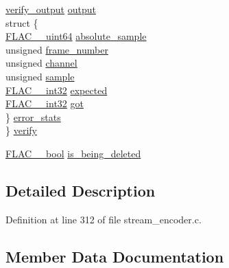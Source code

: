 \begin{DoxyCompactItemize}
\begin{tabbing}
\>\hyperlink{structverify__output}{verify\_output} \hyperlink{struct_f_l_a_c_____stream_encoder_private_a74297fbdc0db820c8e288ba808405d19}{output}\\
\>struct \{\\
\>\>\hyperlink{ordinals_8h_aa78c8c70a3eb8a58af7436f278acde8e}{FLAC\_\_uint64} \hyperlink{struct_f_l_a_c_____stream_encoder_private_ae00280f3e62bdf7601bad7b90c40956c}{absolute\_sample}\\
\>\>unsigned \hyperlink{struct_f_l_a_c_____stream_encoder_private_a73dce3679edc4c743854baf57955e4d5}{frame\_number}\\
\>\>unsigned \hyperlink{struct_f_l_a_c_____stream_encoder_private_a98dbe004c38dab69d0625ae79f0e979e}{channel}\\
\>\>unsigned \hyperlink{struct_f_l_a_c_____stream_encoder_private_aaa58a90dcc7dff79e03e86a51e855966}{sample}\\
\>\>\hyperlink{ordinals_8h_a33fd77bfe6d685541a0c034a75deccdc}{FLAC\_\_int32} \hyperlink{struct_f_l_a_c_____stream_encoder_private_a8dced4ffeff2e4501fd754c867c4b723}{expected}\\
\>\>\hyperlink{ordinals_8h_a33fd77bfe6d685541a0c034a75deccdc}{FLAC\_\_int32} \hyperlink{struct_f_l_a_c_____stream_encoder_private_a9f7322e8f52be0f4814fd287c292cbe6}{got}\\
\>\} \hyperlink{struct_f_l_a_c_____stream_encoder_private_a17dc3f0c51898d4639e7e3dcfb98cd91}{error\_stats}\\
\} \hyperlink{struct_f_l_a_c_____stream_encoder_private_a73a036e52f35aee6fe55f78ed5be68d4}{verify}\\

\end{tabbing}\item 
\hyperlink{ordinals_8h_a95103469f1cbd78b8cf250194985b34e}{F\+L\+A\+C\+\_\+\+\_\+bool} \hyperlink{struct_f_l_a_c_____stream_encoder_private_aa9e56cb0a654ea4a3cb1702a244ab65b}{is\+\_\+being\+\_\+deleted}
\end{DoxyCompactItemize}


\subsection{Detailed Description}


Definition at line 312 of file stream\+\_\+encoder.\+c.



\subsection{Member Data Documentation}
